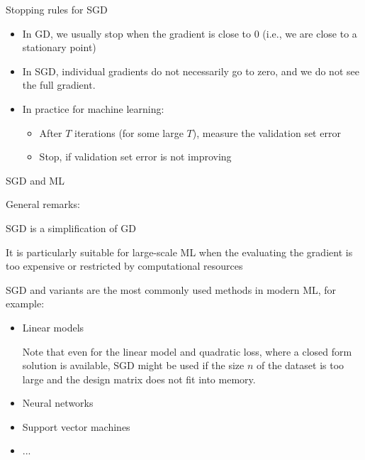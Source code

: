 \documentclass[11pt,compress,t,notes=noshow, xcolor=table]{beamer}
\begin{document}
\begin{vbframe}{Stopping rules for SGD} 

\begin{itemize}
	\item In GD, we usually stop when the gradient is close to $0$ (i.e., we are close to a stationary point)
	\item In SGD, individual gradients do not necessarily go to zero, and we do not see the full gradient. 
	\item In practice for machine learning: 
	\begin{itemize}
		\item After $T$ iterations (for some large $T$), measure the validation set error
		\item Stop, if validation set error is not improving
	\end{itemize}
\end{itemize}


\end{vbframe}


\begin{vbframe}{SGD and ML}

	\begin{blocki}{General remarks:}
		\item SGD is a simplification of GD 
		\item It is particularly suitable for large-scale ML when the evaluating the gradient is too expensive or restricted by computational resources
		\item SGD and variants are the most commonly used methods in modern ML, for example:  
		\begin{itemize}
			\item Linear models \\
			\begin{footnotesize}
			Note that even for the linear model and quadratic loss, where a closed form solution is available, SGD might be used if the size $n$ of the dataset is too large and the design matrix does not fit into memory. 			\end{footnotesize}
			\item Neural networks 
			\item Support vector machines
			\item ...
		\end{itemize}
	\end{blocki}

\end{vbframe}
\end{document}
